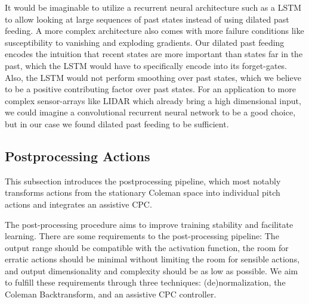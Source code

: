 It would be imaginable to utilize a recurrent neural architecture such as a LSTM \cite{hochreiterLongShortTermMemory1997} to allow looking at large sequences of past states instead of using dilated past feeding. A more complex architecture also comes with more failure conditions like susceptibility to vanishing and exploding gradients. Our dilated past feeding encodes the intuition that recent states are more important than states far in the past, which the LSTM would have to specifically encode into its forget-gates. Also, the LSTM would not perform smoothing over past states, which we believe to be a positive contributing factor over past states. For an application to more complex sensor-arrays like LIDAR which already bring a high dimensional input, we could imagine a convolutional recurrent neural network to be a good choice, but in our case we found dilated past feeding to be sufficient.

\subsection{Postprocessing Actions}
\label{section:approach-postprocessing}

\begin{summary}
This subsection introduces the postprocessing pipeline, which most notably transforms actions from the stationary Coleman space into individual pitch actions and integrates an assistive \ac{CPC}.
\end{summary}

The post-processing procedure aims to improve training stability and facilitate learning. There are some requirements to the post-processing pipeline: The output range should be compatible with the activation function, the room for erratic actions should be minimal without limiting the room for sensible actions, and output dimensionality and complexity should be as low as possible. We aim to fulfill these requirements through three techniques: (de)normalization, the Coleman Backtransform, and an assistive CPC controller.


